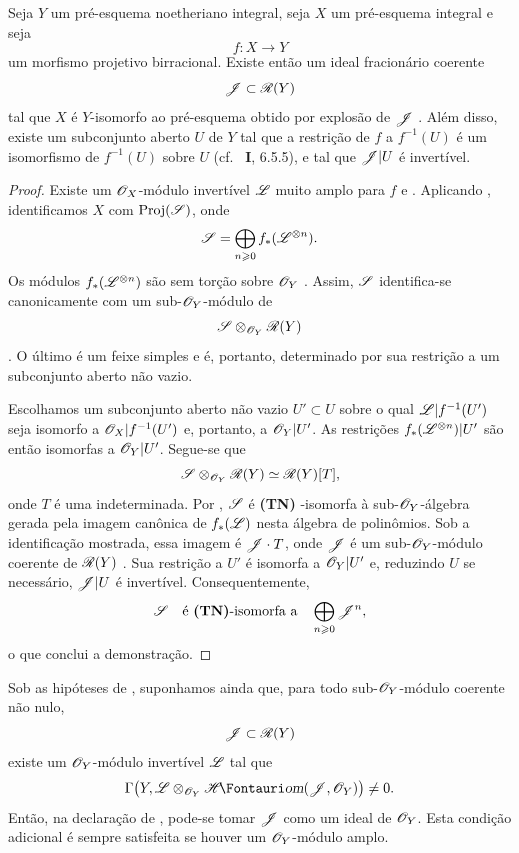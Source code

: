 \begin{proposition}[2.3.5]
\label{III.2.3.5}
Seja $Y$ um pré-esquema noetheriano integral, seja $X$ um pré-esquema integral e seja
\[
  f:X\longrightarrow Y
\]
um morfismo projetivo birracional.
Existe então um ideal fracionário coerente
\[
  \mathscr{J}\subset\mathscr{R}(Y)
\]
 tal que $X$ é $Y$-isomorfo ao pré-esquema obtido por explosão de $\mathscr{J}$ .
Além disso, existe um subconjunto aberto $U$ de $Y$ tal que a restrição de $f$ a $f^{-1}(U)$ é um isomorfismo de $f^{-1}(U)$ sobre $U$ (cf. \ \textbf{I}, 6.5.5), e tal que $\mathscr{J}|U$ é invertível.
\end{proposition}

\begin{proof}
Existe um $\mathscr{O}_X$-módulo invertível $\mathscr{L}$ muito amplo para $f$  e .
Aplicando , identificamos $X$ com $\operatorname{Proj}(\mathscr{S})$, onde
\[
  \mathscr{S}=\bigoplus_{n\geqslant0}f_*(\mathscr{L}^{\otimes n}).
\]
Os módulos $f_*(\mathscr{L}^{\otimes n})$ são sem torção sobre $\mathscr{O}_Y$ .
Assim, $\mathscr{S}$ identifica-se canonicamente com um sub-$\mathscr{O}_Y$-módulo de
\[
  \mathscr{S}\otimes_{\mathscr{O}_Y}\mathscr{R}(Y)
\]
.
O último é um feixe simples  e é, portanto, determinado por sua restrição a um subconjunto aberto não vazio.

Escolhamos um subconjunto aberto não vazio $U'\subset U$ sobre o qual $\mathscr{L}|f^{-1}(U')$ seja isomorfo a $\mathscr{O}_X|f^{-1}(U')$ e, portanto, a $\mathscr{O}_Y|U'$.
As restrições $f_*(\mathscr{L}^{\otimes n})|U'$ são então isomorfas a $\mathscr{O}_Y|U'$.
Segue-se que
\[
  \mathscr{S}\otimes_{\mathscr{O}_Y}\mathscr{R}(Y)
  \simeq\mathscr{R}(Y)[T],
\]
onde $T$ é uma indeterminada.
Por , $\mathscr{S}$ é \textbf{(TN) }-isomorfa à sub-$\mathscr{O}_Y$-álgebra gerada pela imagem canônica de $f_*(\mathscr{L})$ nesta álgebra de polinômios.
Sob a identificação mostrada, essa imagem é $\mathscr{J}\cdot T$, onde $\mathscr{J}$ é um sub-$\mathscr{O}_Y$-módulo coerente de $\mathscr{R}(Y)$ .
Sua restrição a $U'$ é isomorfa a $\mathscr{O}_Y|U'$ e, reduzindo $U$ se necessário, $\mathscr{J}|U$ é invertível.
Consequentemente,
\[
  \mathscr{S}\quad\text{é \textbf{(TN)}-isomorfa a}\quad
  \bigoplus_{n\geqslant0}\mathscr{J}^n,
\]
o que conclui a demonstração.
\end{proof}

\begin{corollary}[2.3.6]
\label{III.2.3.6}
Sob as hipóteses de , suponhamos ainda que, para todo sub-$\mathscr{O}_Y$-módulo coerente não nulo,
\[
  \mathscr{J}\subset\mathscr{R}(Y)
\]
existe um $\mathscr{O}_Y$-módulo invertível $\mathscr{L}$ tal que
\[
  \Gamma\bigl(Y,\sh{L}\otimes_{\sh{O}_Y}
  \shHom(\sh{J},\sh{O}_Y)\bigr)\neq0.
\]
Então, na declaração de , pode-se tomar $\mathscr{J}$ como um ideal de $\mathscr{O}_Y$.
Esta condição adicional é sempre satisfeita se houver um $\mathscr{O}_Y$-módulo amplo.
\end{corollary}

